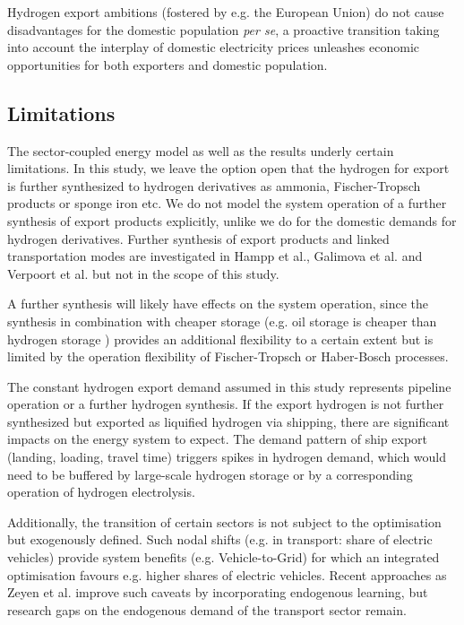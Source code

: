Hydrogen export ambitions (fostered by e.g. the European Union) do not cause disadvantages for the domestic population \textit{per se}, a proactive transition taking into account the interplay of domestic electricity prices unleashes economic opportunities for both exporters and domestic population.



\subsection*{Limitations}
\label{subsec:limitations}

The sector-coupled energy model as well as the results underly certain limitations. In this study, we leave the option open that the hydrogen for export is further synthesized to hydrogen derivatives as ammonia, Fischer-Tropsch products or sponge iron etc. We do not model the system operation of a further synthesis of export products explicitly, unlike we do for the domestic demands for hydrogen derivatives. Further synthesis of export products and linked transportation modes are investigated in Hampp et al.\cite{Hampp2023}, Galimova et al.\cite{Galimova2023} and Verpoort et al.\cite{Verpoort2023} but not in the scope of this study.

A further synthesis will likely have effects on the system operation, since the synthesis in combination with cheaper storage (e.g. oil storage is cheaper than hydrogen storage \cite{DEA2019TechnologyData}) provides an additional flexibility to a certain extent but is limited by the operation flexibility of Fischer-Tropsch or Haber-Bosch processes.

The constant hydrogen export demand assumed in this study represents pipeline operation or a further hydrogen synthesis.
If the export hydrogen is not further synthesized but exported as liquified hydrogen via shipping, there are significant impacts on the energy system to expect. The demand pattern of ship export (landing, loading, travel time) triggers spikes in hydrogen demand, which would need to be buffered by large-scale hydrogen storage or by a corresponding operation of hydrogen electrolysis. 


Additionally, the transition of certain sectors is not subject to the optimisation but exogenously defined. Such nodal shifts (e.g. in transport: share of electric vehicles) provide system benefits (e.g. Vehicle-to-Grid) for which an integrated optimisation favours e.g. higher shares of electric vehicles.
Recent approaches as Zeyen et al.\cite{Zeyen2023} improve such caveats by incorporating endogenous learning, but research gaps on the endogenous demand of the transport sector remain.

